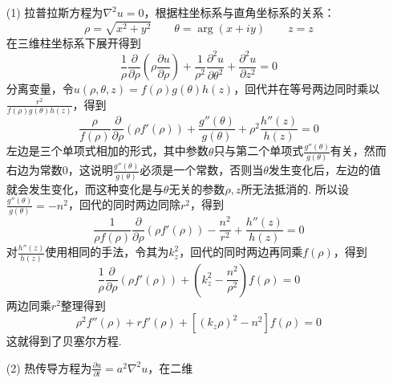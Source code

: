 \documentclass[main.tex]{subfiles}
\begin{document}
\begin{itemize}
    \item[(1)] 拉普拉斯方程为\(\nabla^2 u =0\)，根据柱坐标系与直角坐标系的关系：
    \[\rho = \sqrt{x^2+y^2} \qquad \theta = \arg(x+iy) \qquad z = z\]
    在三维柱坐标系下展开得到
    \[\frac{1}{\rho}\frac{\partial}{\partial \rho}\left(\rho\frac{\partial u}{\partial \rho}\right) + \frac{1}{\rho^2}\frac{\partial^2 u}{\partial \theta^2} + \frac{\partial^2 u}{\partial z^2} = 0\]
    分离变量，令\(u(\rho,\theta,z)=f(\rho)g(\theta)h(z)\)，回代并在等号两边同时乘以\(\displaystyle{\frac{r^2}{f(\rho)g(\theta)h(z)}}\)，得到
    \[\frac{\rho}{f(\rho)}\frac{\partial}{\partial \rho}\left(\rho f'(\rho)\right) + \frac{g''(\theta)}{g(\theta)} + \rho^2\frac{h''(z)}{h(z)} = 0\]
    左边是三个单项式相加的形式，其中参数\(\theta\)只与第二个单项式\(\displaystyle{\frac{g''(\theta)}{g(\theta)}}\)有关，然而右边为常数\(0\)，这说明\(\displaystyle{\frac{g''(\theta)}{g(\theta)}}\)必须是一个常数，否则当\(\theta\)发生变化后，左边的值就会发生变化，而这种变化是与\(\theta\)无关的参数\(\rho,z\)所无法抵消的. 所以设\(\displaystyle{\frac{g''(\theta)}{g(\theta)}} = -n^2\)，回代的同时两边同除\(r^2\)，得到
    \[\frac{1}{\rho f(\rho)}\frac{\partial}{\partial \rho}\left(\rho f'(\rho)\right) -\frac{n^2}{r^2} + \frac{h''(z)}{h(z)} = 0\]
    对\(\displaystyle{\frac{h''(z)}{h(z)}}\)使用相同的手法，令其为\(k_z^2\)，回代的同时两边再同乘\(f(\rho)\)，得到
    \[\frac{1}{\rho}\frac{\partial}{\partial \rho}\left(\rho f'(\rho)\right) + \left(k_z^2-\frac{n^2}{\rho^2}\right)f(\rho) = 0\]
    两边同乘\(r^2\)整理得到
    \[\rho^2f''(\rho)+rf'(\rho)+[(k_z\rho)^2-n^2]f(\rho) = 0\]
    这就得到了贝塞尔方程.
    \item[(2)] 热传导方程为\(\displaystyle{\frac{\partial u}{\partial t} = a^2\nabla^2 u}\)，在二维
\end{itemize}
\end{document}
